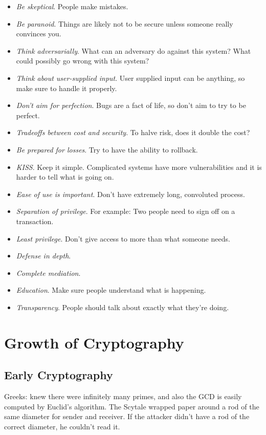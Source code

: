 \documentclass[psamsfonts]{amsart}
\begin{document}
\begin{itemize}
\item \emph{Be skeptical}. People make mistakes.
\item \emph{Be paranoid}. Things are likely not to be secure unless someone really convinces you.
\item \emph{Think adversarially}. What can an adversary do against this system? What could possibly go wrong with this system?
\item \emph{Think about user-supplied input}. User supplied input can be anything, so make sure to handle it properly.
\item \emph{Don't aim for perfection}. Bugs are a fact of life, so don't aim to try to be perfect.
\item \emph{Tradeoffs between cost and security}. To halve risk, does it double the cost?
\item \emph{Be prepared for losses}. Try to have the ability to rollback.
\item \emph{KISS}. Keep it simple. Complicated systems have more vulnerabilities and it is harder to tell what is going on.
\item \emph{Ease of use is important}. Don't have extremely long, convoluted process.
\item \emph{Separation of privilege}. For example: Two people need to sign off on a transaction.
\item \emph{Least privilege}. Don't give access to more than what someone needs.
\item \emph{Defense in depth}. 
\item \emph{Complete mediation}. 
\item \emph{Education}. Make sure people understand what is happening.
\item \emph{Transparency}. People should talk about exactly what they're doing.
\end{itemize}

\section{Growth of Cryptography}

\subsection{Early Cryptography}

Greeks: knew there were infinitely many primes, and also the GCD is easily computed by Euclid's algorithm. The Scytale wrapped paper around a rod of the same diameter for sender and receiver. If the attacker didn't have a rod of the correct diameter, he couldn't read it.
\end{document}
